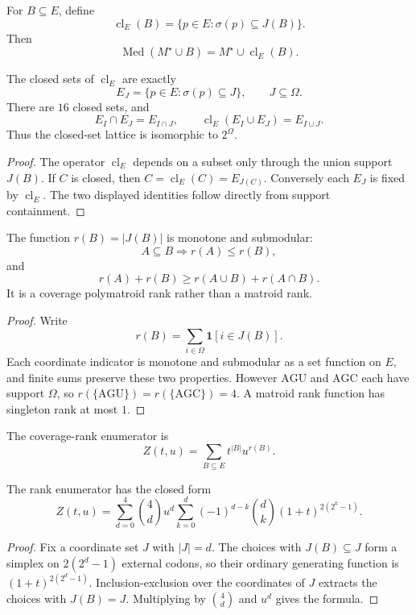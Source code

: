 \begin{definition}
\label{def:philosophy-external-trigger-closure}
For $B\subseteq E$, define
$$
  \operatorname{cl}_{E}(B)
  =
  \{p\in E:\sigma(p)\subseteq J(B)\}.
$$
Then
$$
  \operatorname{Med}(M^{\star}\cup B)
  =
  M^{\star}\cup\operatorname{cl}_{E}(B).
$$
\end{definition}

\begin{theorem}
\label{thm:philosophy-coverage-closed-set-lattice}
The closed sets of $\operatorname{cl}_{E}$ are exactly
$$
  E_{J}=\{p\in E:\sigma(p)\subseteq J\},
  \qquad J\subseteq\Omega.
$$
There are $16$ closed sets, and
$$
  E_{I}\cap E_{J}=E_{I\cap J},
  \qquad
  \operatorname{cl}_{E}(E_{I}\cup E_{J})=E_{I\cup J}.
$$
Thus the closed-set lattice is isomorphic to $2^{\Omega}$.
\end{theorem}
\begin{proof}
The operator $\operatorname{cl}_{E}$ depends on a subset only through
the union support $J(B)$. If $C$ is closed, then
$C=\operatorname{cl}_{E}(C)=E_{J(C)}$. Conversely each $E_{J}$ is fixed
by $\operatorname{cl}_{E}$. The two displayed identities follow
directly from support containment.
\end{proof}

\begin{theorem}
\label{thm:philosophy-coverage-polymatroid-rank}
The function $r(B)=|J(B)|$ is monotone and submodular:
$$
  A\subseteq B \Longrightarrow r(A)\leq r(B),
$$
and
$$
  r(A)+r(B)\geq r(A\cup B)+r(A\cap B).
$$
It is a coverage polymatroid rank rather than a matroid rank.
\end{theorem}
\begin{proof}
Write
$$
  r(B)=\sum_{i\in\Omega}\mathbf{1}[i\in J(B)].
$$
Each coordinate indicator is monotone and submodular as a set function
on $E$, and finite sums preserve these two properties. However
$\mathrm{AGU}$ and $\mathrm{AGC}$ each have support $\Omega$, so
$r(\{\mathrm{AGU}\})=r(\{\mathrm{AGC}\})=4$. A matroid rank function
has singleton rank at most $1$.
\end{proof}

\begin{definition}
\label{def:philosophy-rank-enumerator}
The coverage-rank enumerator is
$$
  Z(t,u)=\sum_{B\subseteq E}t^{|B|}u^{r(B)}.
$$
\end{definition}

\begin{theorem}
\label{thm:philosophy-rank-enumerator-formula}
The rank enumerator has the closed form
$$
  Z(t,u)
  =
  \sum_{d=0}^{4}
  \binom{4}{d}u^{d}
  \sum_{k=0}^{d}
  (-1)^{d-k}
  \binom{d}{k}
  (1+t)^{2(2^{k}-1)}.
$$
\end{theorem}
\begin{proof}
Fix a coordinate set $J$ with $|J|=d$. The choices with
$J(B)\subseteq J$ form a simplex on $2(2^{d}-1)$ external codons, so
their ordinary generating function is $(1+t)^{2(2^{d}-1)}$.
Inclusion-exclusion over the coordinates of $J$ extracts the choices
with $J(B)=J$. Multiplying by $\binom{4}{d}$ and $u^{d}$ gives the
formula.
\end{proof}


